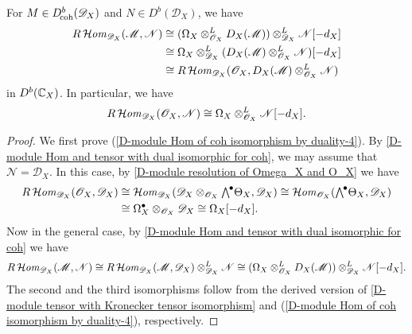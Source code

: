 \begin{proposition}\label{D-module Hom of coh isomorphism by duality}
For $M\in D^b_{\!\mathrm{coh}}(\mathscr{D}_X)$ and $N\in D^b(\mathscr{D}_X)$, we have
\begin{align}
R\operatorname{\mathcal{H}\hspace*{-0.4pt}\textit{om}\hspace{0.5pt}}_{\mathscr{D}_X}(\mathscr{M},\mathscr{N})&\cong(\Omega_X\otimes_{\mathscr{O}_X}^LD_X(\mathscr{M}))\otimes_{\mathscr{D}_X}^L\mathscr{N}[-d_X]\label{D-module Hom of coh isomorphism by duality-1}\\
&\cong \Omega_X\otimes_{\mathscr{D}_X}^L(D_X(\mathscr{M})\otimes_{\mathscr{O}_X}^L\mathscr{N})[-d_X]\label{D-module Hom of coh isomorphism by duality-2}\\
&\cong R\operatorname{\mathcal{H}\hspace*{-0.4pt}\textit{om}\hspace{0.5pt}}_{\mathscr{D}_X}(\mathscr{O}_X,D_X(\mathscr{M})\otimes_{\mathscr{O}_X}^L\mathscr{N}) \label{D-module Hom of coh isomorphism by duality-3}
\end{align}
in $D^b(\mathbb{C}_X)$. In particular, we have 
\begin{equation}\label{D-module Hom of coh isomorphism by duality-4}
R\operatorname{\mathcal{H}\hspace*{-0.4pt}\textit{om}\hspace{0.5pt}}_{\mathscr{D}_X}(\mathscr{O}_X,\mathscr{N})\cong\Omega_X\otimes_{\mathscr{O}_X}^L\mathscr{N}[-d_X].
\end{equation}
\end{proposition}
\begin{proof}
We first prove (\ref{D-module Hom of coh isomorphism by duality-4}). By \cref{D-module Hom and tensor with dual isomorphic for coh}, we may assume that $\mathscr{N}=\mathscr{D}_X$. In this case, by \cref{D-module resolution of Omega_X and O_X} we have
\begin{align*}
R\sHom_{\mathscr{D}_X}(\mathscr{O}_X,\mathscr{D}_X)&\cong \sHom_{\mathscr{D}_X}(\mathscr{D}_X\otimes_{\mathscr{O}_X}\bigw^\bullet\Theta_X,\mathscr{D}_X)\cong\sHom_{\mathscr{O}_X}(\bigw^\bullet\Theta_X,\mathscr{D}_X)\\
&\cong\Omega_X^\bullet\otimes_{\mathscr{O}_X}\mathscr{D}_X\cong\Omega_X[-d_X].
\end{align*}
Now in the general case, by \cref{D-module Hom and tensor with dual isomorphic for coh} we have
\begin{align*}
R\operatorname{\mathcal{H}\hspace*{-0.4pt}\textit{om}\hspace{0.5pt}}_{\mathscr{D}_X}(\mathscr{M},\mathscr{N})\cong R\operatorname{\mathcal{H}\hspace*{-0.4pt}\textit{om}\hspace{0.5pt}}_{\mathscr{D}_X}(\mathscr{M},\mathscr{D}_X)\otimes_{\mathscr{D}_X}^L\mathscr{N}\cong(\Omega_X\otimes_{\mathscr{O}_X}^LD_X(\mathscr{M}))\otimes_{\mathscr{D}_X}^L\mathscr{N}[-d_X].
\end{align*}
The second and the third isomorphisms follow from the derived version of \cref{D-module tensor with Kronecker tensor isomorphism} and (\ref{D-module Hom of coh isomorphism by duality-4}), respectively.
\end{proof}

